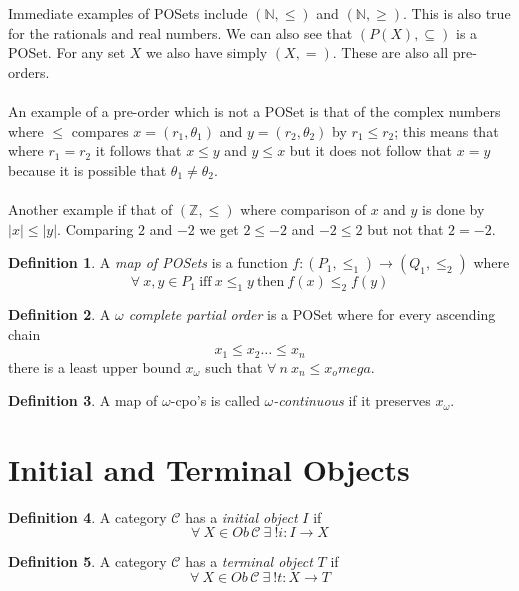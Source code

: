 \documentclass{article}
\theoremstyle{definition}
\newtheorem{definition}{Definition}[section]
\begin{document}
Immediate examples of POSets include $(\mathbb{N},\leq)$ and $(\mathbb{N},\geq)$.
This is also true for the rationals and real numbers.
We can also see that $(P(X), \subseteq)$ is a POSet.
For any set $X$ we also have simply $(X,=)$.
These are also all pre-orders.
\\ \\
An example of a pre-order which is not a POSet is that of the complex numbers
where $\leq$ compares $x = (r_1,\theta_1)$ and $y = (r_2,\theta_2)$ by $r_1 \leq r_2$;
this means that where $r_1 = r_2$ it follows that $x \leq y$ and $y \leq x$
but it does not follow that $x = y$ because it is possible that $\theta_1 \neq \theta_2$.
\\ \\
Another example if that of $(\mathbb{Z},\leq)$ where comparison of $x$ and $y$ is done by
$|x| \leq |y|$.
Comparing $2$ and $-2$ we get $2 \leq -2$ and $-2 \leq 2$ but not that $2 = -2$.

\begin{definition}
    A \textit{map of POSets} is a function $f : (P_1,\leq_1) \rightarrow (Q_1,\leq_2)$ where
    $$\forall\ x,y \in P_1\ \textrm{iff}\ x \leq_1 y\ \textrm{then}\ f(x) \leq_2 f(y)$$
\end{definition}

\begin{definition}
    A \textit{$\omega$ complete partial order} is a POSet where for every ascending chain
    $$x_1 \leq x_2 \dots \leq x_n$$
    there is a least upper bound $x_\omega$ such that $\forall\ n\ x_n \leq x_omega$.
\end{definition}

\begin{definition}
    A map of $\omega$-cpo's is called \textit{$\omega$-continuous}
    if it preserves $x_\omega$.
\end{definition}

\section{Initial and Terminal Objects}

\begin{definition}
    A category $\mathcal{C}$ has a \textit{initial object} $I$ if
    $$\forall\ X \in Ob\,\mathcal{C}\ \exists\ !i : I \rightarrow X$$
\end{definition}

\begin{definition}
    A category $\mathcal{C}$ has a \textit{terminal object} $T$ if
    $$\forall\ X \in Ob\,\mathcal{C}\ \exists\ !t : X \rightarrow T$$
\end{definition}
\end{document}
